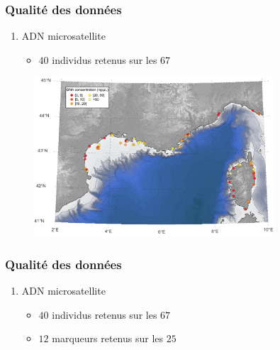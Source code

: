 \documentclass[10pt,xcolor=table]{beamer}\usepackage[]{graphicx}\usepackage[]{color}
\begin{document}
\begin{frame}
	\frametitle{Qualité des données}
	
\begin{enumerate}
	\item ADN microsatellite
	
	\begin{itemize}
		\item $40$ individus retenus sur les $67$
	\end{itemize}
	
\end{enumerate}	
	
	\begin{figure}
		\begin{center}
		\includegraphics[width=9cm]{concentrations}
		\end{center}
	\end{figure}
\end{frame}


\begin{frame}
	\frametitle{Qualité des données}
\begin{enumerate}
	\item ADN microsatellite
	\begin{itemize}
		\item $40$ individus retenus sur les $67$
		\item $12$ marqueurs retenus sur les $25$
	\end{itemize}
\end{enumerate}
\\[6.2cm]
\end{frame}
\end{document}
